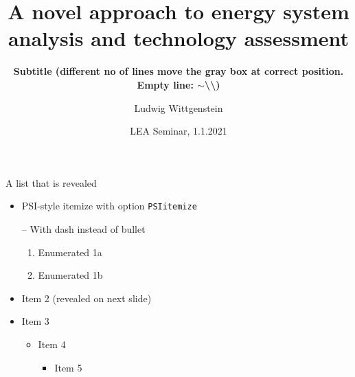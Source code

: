\documentclass[aspectratio=169,smaller]{beamer}
\begin{document}
\title{A novel approach to energy system analysis and technology assessment}

\author[L.~Wittgenstein]{Ludwig Wittgenstein}


\subtitle{\textbf{Subtitle (different no of lines move the gray box at correct position. Empty line:  $\sim$\textbackslash\textbackslash)}}

\date{LEA Seminar, 1.1.2021} %


\begin{frame}[plain] %
  \titlepage
\end{frame}


\begin{frame}[t]{A list that is revealed}
   \PSIvspace
  \begin{itemize}
  \item PSI-style itemize with option \texttt{PSIitemize}
  \item[--]  With dash instead of bullet
    \begin{enumerate}
    \item Enumerated 1a
    \item Enumerated 1b
    \end{enumerate}
    \pause
  \item Item 2 (revealed on next slide)
    \pause
  \item Item 3
    \begin{itemize}
    \item Item 4
      \begin{itemize}
      \item Item 5
      \end{itemize}
    \end{itemize}
  \end{itemize}
\end{frame}
\end{document}
